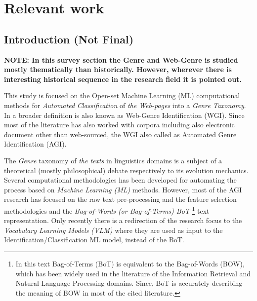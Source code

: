
\chapter{Relevant work}

\label{chap:relevant_work}


\newcommand{\keyword}[1]{\textbf{#1}}
\newcommand{\tabhead}[1]{\textbf{#1}}
\newcommand{\code}[1]{\texttt{#1}}
\newcommand{\file}[1]{\texttt{\bfseries#1}}
\newcommand{\option}[1]{\texttt{\itshape#1}}


\section{Introduction (Not Final)}\label{chap:relevant_work:sec:intro}

\textbf{NOTE: In this survey section the Genre and Web-Genre is studied mostly thematically than historically. However, wherever there is interesting historical sequence in the research field it is pointed out.}

This study is focused on the Open-set Machine Learning (ML) computational methods for \textit{Automated Classification} of \textit{the Web-pages} into a \textit{Genre Taxonomy}. In a broader definition is also known as Web-Genre Identification (WGI). Since most of the literature has also worked with corpora including also electronic document other than web-sourced, the WGI also called as Automated Genre Identification (AGI).

The \textit{Genre} taxonomy of \textit{the texts} in linguistics domains is a subject of a theoretical (mostly philosophical) debate respectively to its evolution mechanics. Several computational methodologies has been developed for automating the process based on \textit{Machine Learning (ML)} methods. However, most of the AGI research has focused on the raw text pre-processing and the feature selection methodologies and the \textit{Bag-of-Words (or Bag-of-Terms) BoT }\footnote{In this text Bag-of-Terms (BoT) is equivalent to the Bag-of-Words  (BOW), which has been widely used in the literature of the Information Retrieval and Natural Language Processing domains. Since, BoT is accurately describing the meaning of BOW in most of the cited literature.} text representation. Only recently there is a redirection of the research focus to the \textit{Vocabulary Learning Models (VLM)} where they are used as input to the Identification/Classification ML model, instead of the BoT. 






